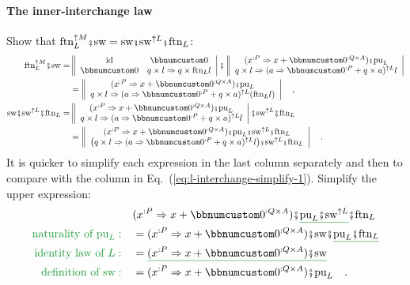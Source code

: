\paragraph{The inner-interchange law}

Show that $\text{ftn}_{L}^{\uparrow M}\bef\text{sw}=\text{sw}\bef\text{sw}^{\uparrow L}\bef\text{ftn}_{L}$:
\begin{align}
\text{ftn}_{L}^{\uparrow M}\bef\text{sw}= & \left\Vert \begin{array}{cc}
\text{id} & \bbnum 0\\
\bbnum 0 & q\times l\Rightarrow q\times\text{ftn}_{L}l
\end{array}\right|\bef\left\Vert \begin{array}{c}
(x^{:P}\Rightarrow x+\bbnum 0^{:Q\times A})\bef\text{pu}_{L}\\
q\times l\Rightarrow(a\Rightarrow\bbnum 0^{:P}+q\times a)^{\uparrow L}l
\end{array}\right|\nonumber \\
 & =\left\Vert \begin{array}{c}
(x^{:P}\Rightarrow x+\bbnum 0^{:Q\times A})\bef\text{pu}_{L}\\
q\times l\Rightarrow(a\Rightarrow\bbnum 0^{:P}+q\times a)^{\uparrow L}(\text{ftn}_{L}l)
\end{array}\right|\quad,\label{eq:l-interchange-simplify-1}\\
\text{sw}\bef\text{sw}^{\uparrow L}\bef\text{ftn}_{L}= & \left\Vert \begin{array}{c}
(x^{:P}\Rightarrow x+\bbnum 0^{:Q\times A})\bef\text{pu}_{L}\\
q\times l\Rightarrow(a\Rightarrow\bbnum 0^{:P}+q\times a)^{\uparrow L}l
\end{array}\right|\bef\text{sw}^{\uparrow L}\bef\text{ftn}_{L}\nonumber \\
 & =\left\Vert \begin{array}{c}
(x^{:P}\Rightarrow x+\bbnum 0^{:Q\times A})\bef\text{pu}_{L}\bef\text{sw}^{\uparrow L}\bef\text{ftn}_{L}\\
\big(q\times l\Rightarrow(a\Rightarrow\bbnum 0^{:P}+q\times a)^{\uparrow L}l\big)\bef\text{sw}^{\uparrow L}\bef\text{ftn}_{L}
\end{array}\right|\quad.\nonumber 
\end{align}
It is quicker to simplify each expression in the last column separately
and then to compare with the column in Eq.~(\ref{eq:l-interchange-simplify-1}).
Simplify the upper expression:
\begin{align*}
 & (x^{:P}\Rightarrow x+\bbnum 0^{:Q\times A})\bef\gunderline{\text{pu}_{L}\bef\text{sw}^{\uparrow L}}\bef\text{ftn}_{L}\\
{\color{greenunder}\text{naturality of }\text{pu}_{L}:}\quad & =(x^{:P}\Rightarrow x+\bbnum 0^{:Q\times A})\bef\text{sw}\bef\gunderline{\text{pu}_{L}\bef\text{ftn}_{L}}\\
{\color{greenunder}\text{identity law of }L:}\quad & =\gunderline{(x^{:P}\Rightarrow x+\bbnum 0^{:Q\times A})\bef\text{sw}}\\
{\color{greenunder}\text{definition of }\text{sw}:}\quad & =(x^{:P}\Rightarrow x+\bbnum 0^{:Q\times A})\bef\text{pu}_{L}\quad.
\end{align*}
